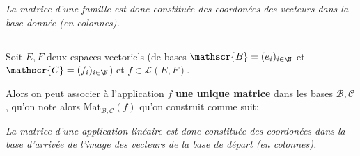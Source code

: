 \begin{center}
   \textit{
      La matrice d'une famille est donc constituée des coordonées des vecteurs\+
      dans la base donnée (en colonnes).
   }
\end{center}
\pagebreak

\subsection*{}

Soit \(E, F\) deux espaces vectoriels (de bases \(\mathscr{B} = (e_i)_{i \in \N}\) et \(\mathscr{C}=(f_i)_{i \in \N}\)) et \(f \in \mathcal{L}(E, F)\).\<

Alors on peut associer à l'application \(f\) \textbf{une unique matrice} dans les bases \(\mathscr{B, C}\), qu'on note alors Mat\(_{\mathscr{B, C}}(f)\) qu'on construit comme suit:
\begin{center}
   \textit{
      La matrice d'une application linéaire est donc constituée des coordonées dans la base d'arrivée de l'image des vecteurs de la base de départ (en colonnes).
   }
\end{center}

